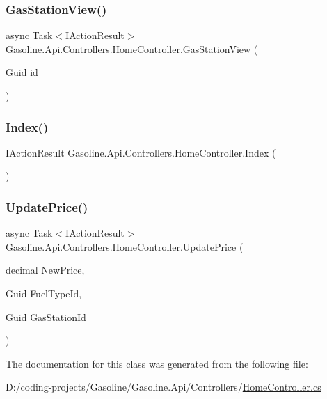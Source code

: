\mbox{\label{class_gasoline_1_1_api_1_1_controllers_1_1_home_controller_a43d8335efef6a8ccbe9ae32522e35d04}} 
\subsubsection{\texorpdfstring{GasStationView()}{GasStationView()}}
{\footnotesize\ttfamily async Task$<$I\+Action\+Result$>$ Gasoline.\+Api.\+Controllers.\+Home\+Controller.\+Gas\+Station\+View (\begin{DoxyParamCaption}\item[{Guid}]{id }\end{DoxyParamCaption})}

\mbox{\label{class_gasoline_1_1_api_1_1_controllers_1_1_home_controller_ac1153104ae0730a37c300bb5f6db6b47}} 
\subsubsection{\texorpdfstring{Index()}{Index()}}
{\footnotesize\ttfamily I\+Action\+Result Gasoline.\+Api.\+Controllers.\+Home\+Controller.\+Index (\begin{DoxyParamCaption}{ }\end{DoxyParamCaption})}

\mbox{\label{class_gasoline_1_1_api_1_1_controllers_1_1_home_controller_a99e21389f410ccd144757cd589c57c51}} 
\subsubsection{\texorpdfstring{UpdatePrice()}{UpdatePrice()}}
{\footnotesize\ttfamily async Task$<$I\+Action\+Result$>$ Gasoline.\+Api.\+Controllers.\+Home\+Controller.\+Update\+Price (\begin{DoxyParamCaption}\item[{decimal}]{New\+Price,  }\item[{Guid}]{Fuel\+Type\+Id,  }\item[{Guid}]{Gas\+Station\+Id }\end{DoxyParamCaption})}



The documentation for this class was generated from the following file\+:\begin{DoxyCompactItemize}
\item 
D\+:/coding-\/projects/\+Gasoline/\+Gasoline.\+Api/\+Controllers/\mbox{\hyperlink{_home_controller_8cs}{Home\+Controller.\+cs}}\end{DoxyCompactItemize}
